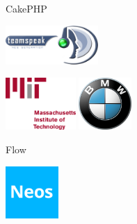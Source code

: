 \begin{frame}{CakePHP}
	\begin{center}
		\includegraphics[height=1.5cm]{img/cake/teamspeak.png}
	\end{center}
	
	\begin{center}
		\includegraphics[height=2cm]{img/cake/mit.png}
		\hfill
		\includegraphics[height=2cm]{img/cake/bmw.png}
	\end{center}
\end{frame}

\begin{frame}{Flow}
	\begin{center}
		\includegraphics[height=2cm]{img/flow/neos.png}
	\end{center}
\end{frame}